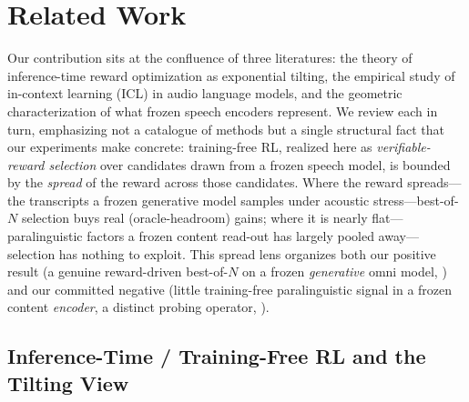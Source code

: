 \section{Related Work}
\label{sec:related}

Our contribution sits at the confluence of three literatures: the theory of inference-time reward optimization as exponential tilting, the empirical study of in-context learning (ICL) in audio language models, and the geometric characterization of what frozen speech encoders represent. We review each in turn, emphasizing not a catalogue of methods but a single structural fact that our experiments make concrete: training-free RL, realized here as \emph{verifiable-reward selection} over candidates drawn from a frozen speech model, is bounded by the \emph{spread} of the reward across those candidates. Where the reward spreads---the transcripts a frozen generative model samples under acoustic stress---best-of-$N$ selection buys real (oracle-headroom) gains; where it is nearly flat---paralinguistic factors a frozen content read-out has largely pooled away---selection has nothing to exploit. This spread lens organizes both our positive result (a genuine reward-driven best-of-$N$ on a frozen \emph{generative} omni model, ) and our committed negative (little training-free paralinguistic signal in a frozen content \emph{encoder}, a distinct probing operator, ).

\subsection{Inference-Time / Training-Free RL and the Tilting View}
\label{sec:rw-tilting}

